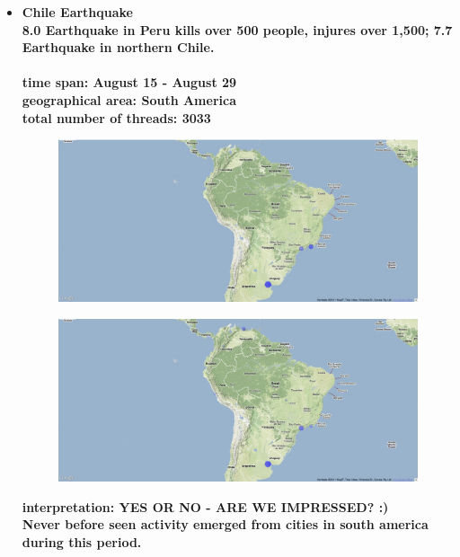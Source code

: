 \documentclass[11pt,a4paper,english]{article}
\begin{document}
\begin{itemize}
						
						
					\item \bf Chile Earthquake \rm
						\\ 8.0 Earthquake in Peru kills over 500 people, injures over 1,500; 7.7 Earthquake in northern Chile.
						\\\\ \bf time span: \rm August 15 - August 29
						\\ \bf geographical area: \rm South America
						\\ \bf total number of threads: \rm 3033
						\begin{figure}[H]
							\vspace{-13pt}
  							\begin{center}
								\includegraphics[width=130mm]{img/pre-chile}
							\end{center}
							\vspace{-13pt}
						\end{figure}
						\begin{figure}[H]
							\vspace{-13pt}
							\begin{center}
								\includegraphics[width=130mm]{img/post-chile}
							\end{center}
							\vspace{-13pt}
						\end{figure}	
						\bf interpretation: \rm YES OR NO - ARE WE IMPRESSED? :)
						\\ Never before seen activity emerged from cities in south america during this period.
						

\end{itemize}
\end{document}
